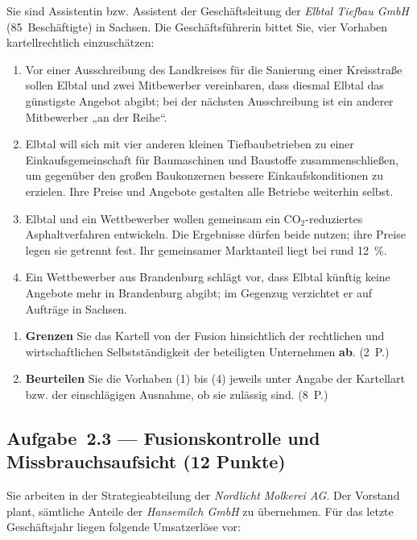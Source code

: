 Sie sind Assistentin bzw. Assistent der Geschäftsleitung der \emph{Elbtal Tiefbau GmbH}
(85~Beschäftigte) in Sachsen. Die Geschäftsführerin bittet Sie, vier Vorhaben
kartellrechtlich einzuschätzen:

\begin{enumerate}[label=(\arabic*)]
  \item Vor einer Ausschreibung des Landkreises für die Sanierung einer Kreisstraße
    sollen Elbtal und zwei Mitbewerber vereinbaren, dass diesmal Elbtal das günstigste
    Angebot abgibt; bei der nächsten Ausschreibung ist ein anderer Mitbewerber „an der Reihe``.
  \item Elbtal will sich mit vier anderen kleinen Tiefbaubetrieben zu einer
    Einkaufsgemeinschaft für Baumaschinen und Baustoffe zusammenschließen, um gegenüber
    den großen Baukonzernen bessere Einkaufskonditionen zu erzielen. Ihre Preise und
    Angebote gestalten alle Betriebe weiterhin selbst.
  \item Elbtal und ein Wettbewerber wollen gemeinsam ein CO$_2$-reduziertes
    Asphaltverfahren entwickeln. Die Ergebnisse dürfen beide nutzen; ihre Preise legen
    sie getrennt fest. Ihr gemeinsamer Marktanteil liegt bei rund 12~\%.
  \item Ein Wettbewerber aus Brandenburg schlägt vor, dass Elbtal künftig keine Angebote
    mehr in Brandenburg abgibt; im Gegenzug verzichtet er auf Aufträge in Sachsen.
\end{enumerate}

\begin{enumerate}[label=\alph*)]
  \item \textbf{Grenzen} Sie das Kartell von der Fusion hinsichtlich der rechtlichen und
    wirtschaftlichen Selbstständigkeit der beteiligten Unternehmen \textbf{ab}. \hfill (2~P.)
  \item \textbf{Beurteilen} Sie die Vorhaben (1) bis (4) jeweils unter Angabe der Kartellart
    bzw. der einschlägigen Ausnahme, ob sie zulässig sind. \hfill (8~P.)
\end{enumerate}

\subsection*{Aufgabe~2.3 --- Fusionskontrolle und Missbrauchsaufsicht (12 Punkte)}

Sie arbeiten in der Strategieabteilung der \emph{Nordlicht Molkerei AG}. Der Vorstand plant,
sämtliche Anteile der \emph{Hansemilch GmbH} zu übernehmen. Für das letzte Geschäftsjahr
liegen folgende Umsatzerlöse vor:

